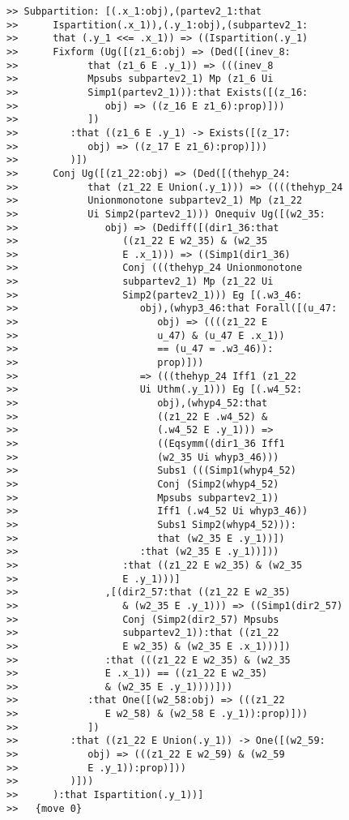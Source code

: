 \documentclass[12pt]{article}
\begin{document}
\begin{verbatim}
>> Subpartition: [(.x_1:obj),(partev2_1:that
>>      Ispartition(.x_1)),(.y_1:obj),(subpartev2_1:
>>      that (.y_1 <<= .x_1)) => ((Ispartition(.y_1)
>>      Fixform (Ug([(z1_6:obj) => (Ded([(inev_8:
>>            that (z1_6 E .y_1)) => (((inev_8
>>            Mpsubs subpartev2_1) Mp (z1_6 Ui
>>            Simp1(partev2_1))):that Exists([(z_16:
>>               obj) => ((z_16 E z1_6):prop)]))
>>            ])
>>         :that ((z1_6 E .y_1) -> Exists([(z_17:
>>            obj) => ((z_17 E z1_6):prop)]))
>>         )])
>>      Conj Ug([(z1_22:obj) => (Ded([(thehyp_24:
>>            that (z1_22 E Union(.y_1))) => ((((thehyp_24
>>            Unionmonotone subpartev2_1) Mp (z1_22
>>            Ui Simp2(partev2_1))) Onequiv Ug([(w2_35:
>>               obj) => (Dediff([(dir1_36:that
>>                  ((z1_22 E w2_35) & (w2_35
>>                  E .x_1))) => ((Simp1(dir1_36)
>>                  Conj (((thehyp_24 Unionmonotone
>>                  subpartev2_1) Mp (z1_22 Ui
>>                  Simp2(partev2_1))) Eg [(.w3_46:
>>                     obj),(whyp3_46:that Forall([(u_47:
>>                        obj) => ((((z1_22 E
>>                        u_47) & (u_47 E .x_1))
>>                        == (u_47 = .w3_46)):
>>                        prop)]))
>>                     => (((thehyp_24 Iff1 (z1_22
>>                     Ui Uthm(.y_1))) Eg [(.w4_52:
>>                        obj),(whyp4_52:that
>>                        ((z1_22 E .w4_52) &
>>                        (.w4_52 E .y_1))) =>
>>                        ((Eqsymm((dir1_36 Iff1
>>                        (w2_35 Ui whyp3_46)))
>>                        Subs1 (((Simp1(whyp4_52)
>>                        Conj (Simp2(whyp4_52)
>>                        Mpsubs subpartev2_1))
>>                        Iff1 (.w4_52 Ui whyp3_46))
>>                        Subs1 Simp2(whyp4_52))):
>>                        that (w2_35 E .y_1))])
>>                     :that (w2_35 E .y_1))]))
>>                  :that ((z1_22 E w2_35) & (w2_35
>>                  E .y_1)))]
>>               ,[(dir2_57:that ((z1_22 E w2_35)
>>                  & (w2_35 E .y_1))) => ((Simp1(dir2_57)
>>                  Conj (Simp2(dir2_57) Mpsubs
>>                  subpartev2_1)):that ((z1_22
>>                  E w2_35) & (w2_35 E .x_1)))])
>>               :that (((z1_22 E w2_35) & (w2_35
>>               E .x_1)) == ((z1_22 E w2_35)
>>               & (w2_35 E .y_1))))]))
>>            :that One([(w2_58:obj) => (((z1_22
>>               E w2_58) & (w2_58 E .y_1)):prop)]))
>>            ])
>>         :that ((z1_22 E Union(.y_1)) -> One([(w2_59:
>>            obj) => (((z1_22 E w2_59) & (w2_59
>>            E .y_1)):prop)]))
>>         )]))
>>      ):that Ispartition(.y_1))]
>>   {move 0}


\end{verbatim}
\end{document}
